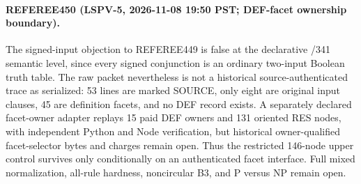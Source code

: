 
\paragraph{REFEREE450 (LSPV-5, 2026-11-08 19:50 PST; DEF-facet ownership boundary).}
The signed-input objection to REFEREE449 is false at the declarative /341
semantic level, since every signed conjunction is an ordinary two-input
Boolean truth table.  The raw packet nevertheless is not a historical
source-authenticated trace as serialized: 53 lines are marked SOURCE, only
eight are original input clauses, 45 are definition facets, and no DEF record
exists.  A separately declared facet-owner adapter replays 15 paid DEF owners
and 131 oriented RES nodes, with independent Python and Node verification,
but historical owner-qualified facet-selector bytes and charges remain open.
Thus the restricted 146-node upper control survives only conditionally on an
authenticated facet interface.  Full mixed normalization, all-rule hardness,
noncircular B3, and P versus NP remain open.
